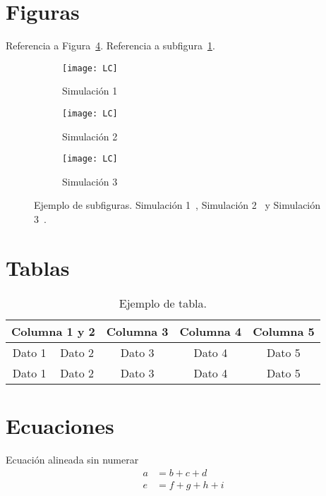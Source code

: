  
\section{Figuras}

Referencia a Figura~\ref{fig:simulaciones}. Referencia a subfigura~\ref{fig:sim1}.

\begin{figure}[h!tb]
\centering
\begin{subfigure}[b]{0.45\linewidth}
\texttt{[image: LC]}
\caption{Simulación 1}
\label{fig:sim1}
\end{subfigure}
\begin{subfigure}[b]{0.45\linewidth}
\texttt{[image: LC]}
\caption{Simulación 2}
\label{fig:sim2}
\end{subfigure}

\begin{subfigure}[b]{0.7\linewidth}
\texttt{[image: LC]}
\caption{Simulación 3}
\label{fig:sim3}
\end{subfigure}

\caption{Ejemplo de subfiguras. Simulación 1~, Simulación 2~ y Simulación 3~.}
\label{fig:simulaciones}
\end{figure}

\section{Tablas}

\begin{table}[h!tb]
\centering
\caption{Ejemplo de tabla.}
\label{tab:ejemplo}
\begin{tabular}{ccccc}
\toprule
\multicolumn{2}{c}{Columna 1 y 2} & Columna 3 & Columna 4 & Columna 5 \\
\midrule
	Dato 1 & Dato 2 & Dato 3 & Dato 4 & Dato 5 \\
\cmidrule(r){1-2} \cmidrule(l){3-5}
	Dato 1 & Dato 2 & Dato 3 & Dato 4 & Dato 5 \\
\bottomrule
\end{tabular}
\end{table}


\section{Ecuaciones}
Ecuación alineada sin numerar
\begin{align*}
a &= b + c + d \\
e &= f + g + h + i
\end{align*}

